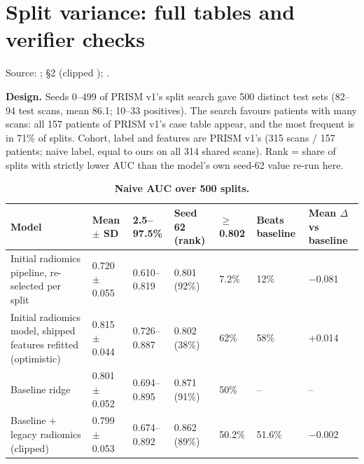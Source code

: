\documentclass[11pt,a4paper]{article}
\begin{document}
\FloatBarrier
\section{Split variance: full tables and verifier checks}\label{sec:S8}

Source: ;
 \S{}2 (clipped
);
.

\textbf{Design.} Seeds 0--499 of PRISM v1's split search gave 500 distinct test sets (82--94 test
scans, mean 86.1; 10--33 positives). The search favours patients with many scans: all 157 patients of
PRISM v1's case table appear, and the most frequent is in 71\% of splits. Cohort, label and features are
PRISM v1's (315 scans / 157 patients; naive label, equal to ours on all 314 shared scans). Rank = share of
splits with strictly lower AUC than the model's own seed-62 value re-run here.

\begin{table}[H]
\centering
\footnotesize
\renewcommand{\thetable}{S13}\renewcommand{\theHtable}{S13}
\caption{\textbf{Naive AUC over 500 splits.}}
\label{tab:S13}
\begin{tabularx}{\linewidth}{@{}L R{2.1cm} R{1.7cm} R{1.6cm} R{1.1cm} R{1.4cm} R{1.5cm}@{}}
\toprule
Model & Mean $\pm$ SD & 2.5--97.5\% & Seed 62 (rank) & $\geq$ 0.802 & Beats baseline & Mean $\Delta$ vs baseline \\
\midrule
Initial radiomics pipeline, re-selected per split & 0.720 $\pm$ 0.055 & 0.610--0.819 & 0.801 (92\%) & 7.2\% & 12\% & $-$0.081 \\
Initial radiomics model, shipped features refitted (optimistic) & 0.815 $\pm$ 0.044 & 0.726--0.887 & 0.802 (38\%) & 62\% & 58\% & +0.014 \\
Baseline ridge & 0.801 $\pm$ 0.052 & 0.694--0.895 & 0.871 (91\%) & 50\% & -- & -- \\
Baseline + legacy radiomics (clipped) & 0.799 $\pm$ 0.053 & 0.674--0.892 & 0.862 (89\%) & 50.2\% & 51.6\% & $-$0.002 \\
\bottomrule
\end{tabularx}
\end{table}
\end{document}

